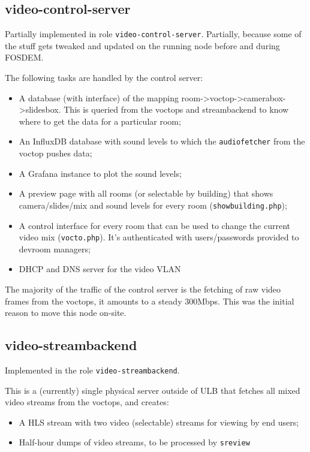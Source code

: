 \documentclass{article}
\begin{document}
\subsection{video-control-server}

Partially implemented in role \texttt{video-control-server}. Partially, because some of the stuff gets tweaked and updated on the running node before and during FOSDEM.

The following tasks are handled by the control server:

\begin{itemize}
  \item A database (with interface) of the mapping room->voctop->camerabox->slidesbox. This is queried from the voctops and streambackend to know where to get the data for a particular room;
  \item An InfluxDB database with sound levels to which the \texttt{audiofetcher} from the voctop pushes data;
  \item A Grafana instance to plot the sound levels;
  \item A preview page with all rooms (or selectable by building) that shows camera/slides/mix and sound levels for every room (\texttt{showbuilding.php});
  \item A control interface for every room that can be used to change the current video mix (\texttt{vocto.php}). It's authenticated with users/passwords provided to devroom managers;
  \item DHCP and DNS server for the video VLAN
\end{itemize}

The majority of the traffic of the control server is the fetching of raw video frames from the voctops, it amounts to a steady 300Mbps. This was the initial reason to move this node on-site.

\subsection{video-streambackend}

Implemented in the role \texttt{video-streambackend}.

This is a (currently) single physical server outside of ULB that fetches all mixed video streams from the voctops, and creates:

\begin{itemize}
  \item A HLS stream with two video (selectable) streams for viewing by end users;
  \item Half-hour dumps of video streams, to be processed by \texttt{sreview}
\end{itemize}
\end{document}
